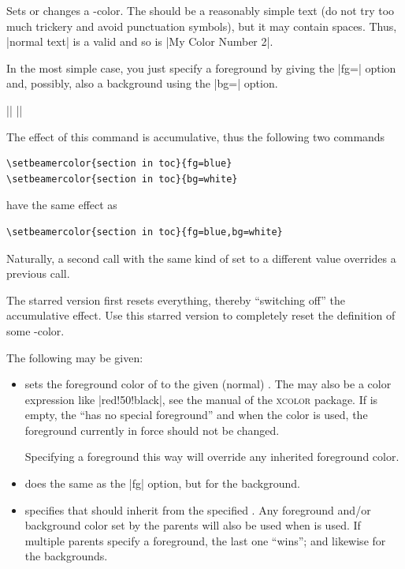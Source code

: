 \begin{command}{\setbeamercolor\opt{|*|}}
  Sets or changes a \beamer-color. The  should be a reasonably simple text (do not try too much trickery and avoid punctuation symbols), but it may contain spaces. Thus, |normal text| is a valid  and so is |My Color Number 2|.

  In the most simple case, you just specify a foreground by giving the |fg=| option and, possibly, also a background using the |bg=| option.

  \example ||
  \example ||

  The effect of this command is accumulative, thus the following two commands

\begin{verbatim}
\setbeamercolor{section in toc}{fg=blue}
\setbeamercolor{section in toc}{bg=white}
\end{verbatim}
  have the same effect as
\begin{verbatim}
\setbeamercolor{section in toc}{fg=blue,bg=white}
\end{verbatim}

  Naturally, a second call with the same kind of  set to a different value overrides a previous call.

  The starred version first resets everything, thereby ``switching off'' the accumulative effect. Use this starred version to completely reset the definition of some \beamer-color.

  The following  may be given:
  \begin{itemize}
  \item
     sets the foreground color of  to the given (normal)   . The  may also be a color expression like |red!50!black|, see the manual of the \textsc{xcolor} package. If  is empty, the  ``has no special foreground'' and when the color is used, the foreground currently in force should not be changed.

    Specifying a foreground this way will override any inherited foreground color.
  \item
     does the same as the |fg| option, but for the background.
  \item
     specifies that  should inherit from the specified . Any foreground and/or background color set by the parents will also be used when  is used. If multiple parents specify a foreground, the last one ``wins''; and likewise for the backgrounds.


\end{itemize}
\end{command}
